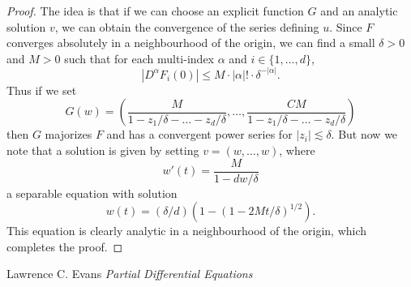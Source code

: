 \begin{proof}
    The idea is that if we can choose an explicit function $G$ and an analytic solution $v$, we can obtain the convergence of the series defining $u$. Since $F$ converges absolutely in a neighbourhood of the origin, we can find a small $\delta > 0$ and $M > 0$ such that for each multi-index $\alpha$ and $i \in \{ 1, \dots, d \}$,
    \[ |D^\alpha F_i(0)| \leq M \cdot |\alpha|! \cdot \delta^{-|\alpha|}. \]
    Thus if we set
    \[ G(w) = \left( \frac{M}{1 - z_1/\delta - \dots - z_d/\delta}, \dots, \frac{CM}{1 - z_1/\delta - \dots - z_d/\delta} \right) \]
    then $G$ majorizes $F$ and has a convergent power series for $|z_i| \lesssim \delta$. But now we note that a solution is given by setting $v = (w,\dots,w)$, where
    \[ w'(t) = \frac{M}{1 - dw/\delta} \]
    a separable equation with solution
    \[ w(t) = (\delta/d)(1 - (1 - 2Mt/\delta)^{1/2}). \]
    This equation is clearly analytic in a neighbourhood of the origin, which completes the proof.
\end{proof}





\begin{thebibliography}{9}

Lawrence C. Evans
\textit{Partial Differential Equations}

\end{thebibliography}

 